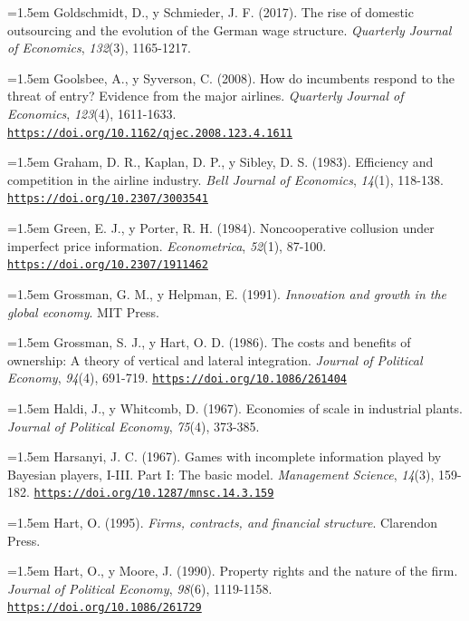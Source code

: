 \documentclass[10pt,a4paper]{article}
\begin{document}
\noindent\hangindent=1.5em Goldschmidt, D., y Schmieder, J. F. (2017). The rise of domestic outsourcing and the evolution of the German wage structure. \textit{Quarterly Journal of Economics}, \textit{132}(3), 1165-1217.

\noindent\hangindent=1.5em Goolsbee, A., y Syverson, C. (2008). How do incumbents respond to the threat of entry? Evidence from the major airlines. \textit{Quarterly Journal of Economics}, \textit{123}(4), 1611-1633. \href{https://doi.org/10.1162/qjec.2008.123.4.1611}{\nolinkurl{https://doi.org/10.1162/qjec.2008.123.4.1611}}

\noindent\hangindent=1.5em Graham, D. R., Kaplan, D. P., y Sibley, D. S. (1983). Efficiency and competition in the airline industry. \textit{Bell Journal of Economics}, \textit{14}(1), 118-138. \href{https://doi.org/10.2307/3003541}{\nolinkurl{https://doi.org/10.2307/3003541}}

\noindent\hangindent=1.5em Green, E. J., y Porter, R. H. (1984). Noncooperative collusion under imperfect price information. \textit{Econometrica}, \textit{52}(1), 87-100. \href{https://doi.org/10.2307/1911462}{\nolinkurl{https://doi.org/10.2307/1911462}}

\noindent\hangindent=1.5em Grossman, G. M., y Helpman, E. (1991). \textit{Innovation and growth in the global economy}. MIT Press.

\noindent\hangindent=1.5em Grossman, S. J., y Hart, O. D. (1986). The costs and benefits of ownership: A theory of vertical and lateral integration. \textit{Journal of Political Economy}, \textit{94}(4), 691-719. \href{https://doi.org/10.1086/261404}{\nolinkurl{https://doi.org/10.1086/261404}}

\noindent\hangindent=1.5em Haldi, J., y Whitcomb, D. (1967). Economies of scale in industrial plants. \textit{Journal of Political Economy}, \textit{75}(4), 373-385.

\noindent\hangindent=1.5em Harsanyi, J. C. (1967). Games with incomplete information played by Bayesian players, I-III. Part I: The basic model. \textit{Management Science}, \textit{14}(3), 159-182. \href{https://doi.org/10.1287/mnsc.14.3.159}{\nolinkurl{https://doi.org/10.1287/mnsc.14.3.159}}

\noindent\hangindent=1.5em Hart, O. (1995). \textit{Firms, contracts, and financial structure}. Clarendon Press.

\noindent\hangindent=1.5em Hart, O., y Moore, J. (1990). Property rights and the nature of the firm. \textit{Journal of Political Economy}, \textit{98}(6), 1119-1158. \href{https://doi.org/10.1086/261729}{\nolinkurl{https://doi.org/10.1086/261729}}
\end{document}

